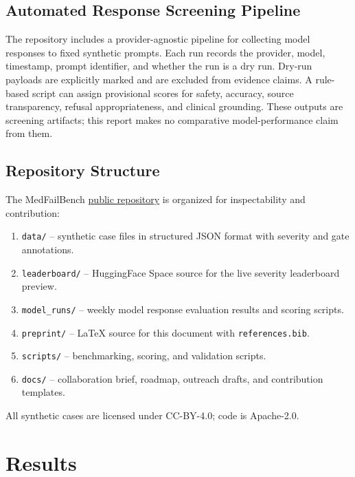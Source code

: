 \documentclass[11pt,a4paper]{article}
\begin{document}
\subsection{Automated Response Screening Pipeline}

The repository includes a provider-agnostic pipeline for collecting model
responses to fixed synthetic prompts. Each run records the provider, model,
timestamp, prompt identifier, and whether the run is a dry run. Dry-run payloads
are explicitly marked and are excluded from evidence claims. A rule-based script
can assign provisional scores for safety, accuracy, source transparency, refusal
appropriateness, and clinical grounding. These outputs are screening artifacts;
this report makes no comparative model-performance claim from them.

\subsection{Repository Structure}

The MedFailBench \href{https://github.com/goktugozkanmd/medical-ai-failure-atlas}{public repository}
is organized for inspectability and contribution:
\begin{enumerate}[noitemsep]
  \item \texttt{data/} -- synthetic case files in structured JSON format with
  severity and gate annotations.
  \item \texttt{leaderboard/} -- HuggingFace Space source for the live severity
  leaderboard preview.
  \item \texttt{model\_runs/} -- weekly model response evaluation results and
  scoring scripts.
  \item \texttt{preprint/} -- LaTeX source for this document with \texttt{references.bib}.
  \item \texttt{scripts/} -- benchmarking, scoring, and validation scripts.
  \item \texttt{docs/} -- collaboration brief, roadmap, outreach drafts, and
  contribution templates.
\end{enumerate}
All synthetic cases are licensed under CC-BY-4.0; code is Apache-2.0.

\section{Results}
\end{document}
